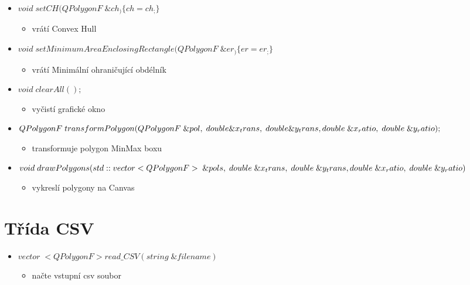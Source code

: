 \documentclass[oneside,12pt,a4paper]{book}
\begin{document}
\begin{itemize}
    \item $void\; setCH(QPolygonF\; \&ch_)\{ch=ch_;\}$
    \begin{itemize}
    \item vrátí Convex Hull
    \end{itemize}
    \item $void\; setMinimumAreaEnclosingRectangle(QPolygonF\; \&er_)\{er=er_;\}$
    \begin{itemize}
    \item vrátí Minimální ohraničující obdélník
    \end{itemize}
    \item $void\; clearAll();$
    \begin{itemize}
    \item vyčistí grafické okno
    \end{itemize}
    \item $QPolygonF\; transformPolygon(QPolygonF\; \&pol, \;double \&x_trans,\; double \&y_trans,\; \\double\; \&x_ratio,\; double\; \&y_ratio);$
    \begin{itemize}
    \item transformuje polygon MinMax boxu
    \end{itemize}
    \item $void\; drawPolygons(std::vector<QPolygonF>\; \&pols,\; double\; \&x_trans,\; double\; \&y_trans,\; \\double\; \&x_ratio,\; double\; \&y_ratio)$
    \begin{itemize}
    \item vykreslí polygony na Canvas
    \end{itemize}
\end{itemize}

   \section{Třída CSV}
    \begin{itemize}
    \item $vector\; <QPolygonF> read\_CSV(string\; \&filename)$
    \begin{itemize}
\item načte vstupní csv soubor
\end{itemize}
\end{itemize}
\end{document}
